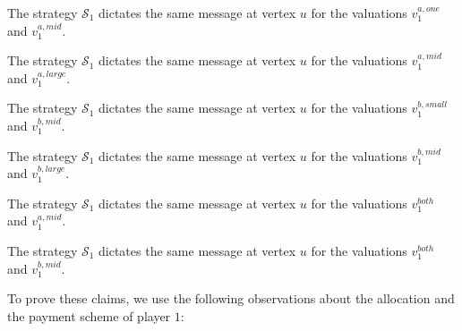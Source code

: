 \begin{claim}\label{claim-a-one-mid-add}
    The strategy $\mathcal S_1$ dictates the same message at vertex $u$ for the valuations $v_1^{a,one}$ and $v_1^{a,mid}$. 
\end{claim}
\begin{claim}\label{claim-a-mid-large-add}
    The strategy $\mathcal S_1$ dictates the same message at vertex $u$ for the valuations $v_1^{a,mid}$ and $v_1^{a,large}$. 
\end{claim}
\begin{claim}\label{claim-b-small-large-add}
    The strategy $\mathcal S_1$ dictates the same message at vertex $u$ for the valuations $v_1^{b,small}$ and $v_1^{b,mid}$. 
\end{claim}
\begin{claim}\label{claim-b-mid-large-add}
    The strategy $\mathcal S_1$ dictates the same message at vertex $u$ for the valuations $v_1^{b,mid}$ and $v_1^{b,large}$. 
\end{claim}
\begin{claim}\label{claim-a-both-add}
    The strategy $\mathcal S_1$ dictates the same message at vertex $u$ for the valuations $v_1^{both}$ and $v_1^{a,mid}$. 
\end{claim}
\begin{claim}\label{claim-b-both-add}
    The strategy $\mathcal S_1$ dictates the same message at vertex $u$ for the valuations $v_1^{both}$ and $v_1^{b,mid}$. 
\end{claim}
To prove these claims, we use the following observations about the allocation and the payment scheme of player $1$:    
